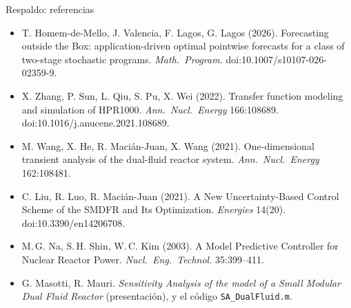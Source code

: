 \documentclass[aspectratio=169,10pt]{beamer}
\begin{document}
\begin{frame}{Respaldo: referencias}
\small
\begin{itemize}\setlength{\itemsep}{.15cm}
\item T. Homem-de-Mello, J. Valencia, F. Lagos, G. Lagos (2026). Forecasting outside the Box: application-driven optimal pointwise forecasts for a class of two-stage stochastic programs. \emph{Math.\ Program.} doi:10.1007/s10107-026-02359-9.
\item X. Zhang, P. Sun, L. Qiu, S. Pu, X. Wei (2022). Transfer function modeling and simulation of HPR1000. \emph{Ann.\ Nucl.\ Energy} 166:108689. doi:10.1016/j.anucene.2021.108689.
\item M. Wang, X. He, R. Macián-Juan, X. Wang (2021). One-dimensional transient analysis of the dual-fluid reactor system. \emph{Ann.\ Nucl.\ Energy} 162:108481.
\item C. Liu, R. Luo, R. Macián-Juan (2021). A New Uncertainty-Based Control Scheme of the SMDFR and Its Optimization. \emph{Energies} 14(20). doi:10.3390/en14206708.
\item M.\,G. Na, S.\,H. Shin, W.\,C. Kim (2003). A Model Predictive Controller for Nuclear Reactor Power. \emph{Nucl.\ Eng.\ Technol.} 35:399--411.
\item G. Masotti, R. Mauri. \emph{Sensitivity Analysis of the model of a Small Modular Dual Fluid Reactor} (presentación), y el código \texttt{SA\_DualFluid.m}.
\end{itemize}
\end{frame}
\end{document}
